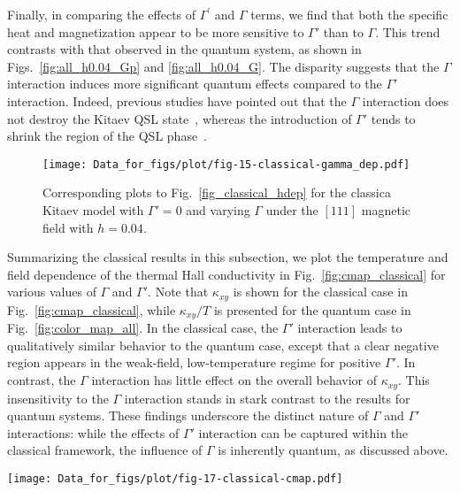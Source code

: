 \documentclass[twocolumn,superscriptaddress,showpacs, longbibliography, aps, prx]{revtex4-2}
\begin{document}
Finally, in comparing the effects of $\Gamma^{\prime}$ and $\Gamma$ terms, we find that both the specific heat and magnetization appear to be more sensitive to $\Gamma'$ than to $\Gamma$. 
This trend contrasts with that observed in the quantum system, as shown in Figs.~\ref{fig:all_h0.04_Gp} and \ref{fig:all_h0.04_G}.
The disparity suggests that the $\Gamma$ interaction induces more significant quantum effects compared to
the $\Gamma'$ interaction.
Indeed, previous studies have pointed out that the $\Gamma$ interaction does not destroy the Kitaev QSL state~\cite{Gohlke_PRB2018,catuneanu2018}, whereas the introduction of $\Gamma'$ tends to shrink the region of the QSL phase~\cite{gordon2019theory,Luo2022}.

\begin{figure}[tbh] 
\begin{center} 
\texttt{[image: Data\_for\_figs/plot/fig-15-classical-gamma\_dep.pdf]}
\vspace{-0.5cm} 
\caption{
Corresponding plots to Fig.~\ref{fig_classical_hdep} for the classica Kitaev model with $\Gamma'=0$ and varying $\Gamma$ under the $[111]$ magnetic field with $h=0.04$.}
\label{fig_classical_gdep004}
\end{center}
\end{figure}

Summarizing the classical results in this subsection, we plot the temperature and field dependence of the thermal Hall conductivity in Fig.~\ref{fig:cmap_classical} for various values of $\Gamma$ and $\Gamma'$.
Note that $\kappa_{xy}$ is shown for the classical case in Fig.~\ref{fig:cmap_classical}, while $\kappa_{xy}/T$ is presented for the quantum case in Fig.~\ref{fig:color_map_all}.
In the classical case, the $\Gamma'$ interaction leads to qualitatively similar behavior to the quantum case, except that a clear negative region appears in the weak-field, low-temperature regime for positive $\Gamma'$. 
In contrast, the $\Gamma$ interaction has little effect on the overall behavior of $\kappa_{xy}$.
This insensitivity to the $\Gamma$ interaction stands in stark contrast to the results for quantum systems.
These findings underscore the distinct nature of $\Gamma$ and $\Gamma'$ interactions: 
while the effects of $\Gamma'$ interaction can be captured within the classical framework, the influence of $\Gamma$ is inherently quantum, as discussed above. 

\begin{figure*}
  \begin{center}
    \texttt{[image: Data\_for\_figs/plot/fig-17-classical-cmap.pdf]}
  \end{center}
  \caption{
Color maps of $\kappa_{xy}$ for the classical model. The panel arrangement is common to Fig.~\ref{fig:color_map_all}.
  }
  \label{fig:cmap_classical}
\end{figure*}
\end{document}
